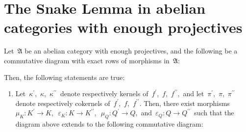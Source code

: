 

\section{The Snake Lemma in abelian categories with enough projectives}
\setcounter{theorem}{0}
\setcounter{equation}{0}


\renewcommand{\theenumi}{\roman{enumi}}
\renewcommand{\labelenumi}{\textnormal{(\theenumi)}$\;\;$}


\begin{theorem}
\mbox{}
\vskip 0.15cm
\noindent
Let \,$\mathfrak{A}$ be an abelian category with enough projectives, and
the following be a commutative diagram with exact rows of morphisms in \,$\mathfrak{A}$:
\begin{center}
\end{center}
Then, the following statements are true:
\begin{enumerate}
\item
	Let
	\,$\kappa^{\prime}$,\, $\kappa$,\, $\kappa^{\prime\prime}$\, 
	denote respectively kernels of
	\,$f^{\prime}$,\, $f$,\, $f^{\prime\prime}$,\,
	and let
	\,$\pi^{\prime}$,\, $\pi$,\, $\pi^{\prime\prime}$\, 
	denote  respectively cokernels of 
	\,$f^{\prime}$,\, $f$,\, $f^{\prime\prime}$.
	Then, there exist morphisms
	\,$\mu_{K} : K^{\prime} \longrightarrow K$,\,
	\,$\varepsilon_{K} : K \longrightarrow K^{\prime\prime}$,\,
	\,$\mu_{Q} : Q^{\prime} \longrightarrow Q$,\,
	and
	\,$\varepsilon_{Q} : Q \longrightarrow Q^{\prime\prime}$\,
	such that the diagram above extends to the following commutative diagram:
	\begin{center}
\end{center}
\end{enumerate}
\end{theorem}
